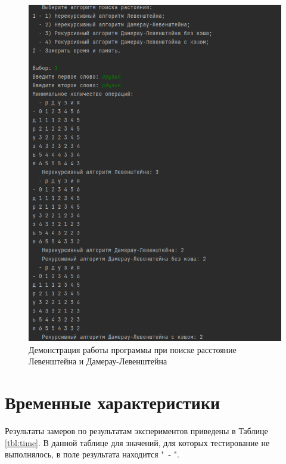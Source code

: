 \documentclass[a4paper,14pt, unknownkeysallowed]{bmstu}
\begin{document}
\begin{figure}[h]
	\centering
	\includegraphics[height=0.4\textheight]{img/example.png}
	\caption{Демонстрация работы программы при поиске расстояние Левенштейна и Дамерау-Левенштейна}
	\label{img:demonstration}
\end{figure}

\clearpage

\section{Временные характеристики}

Результаты замеров по результатам экспериментов приведены в Таблице \ref{tbl:time}. В данной таблице для значений, для которых тестирование не выполнялось, в поле результата находится "\ - ".
\end{document}
